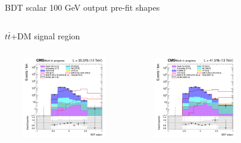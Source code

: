 \documentclass[8pt]{beamer}
\begin{document}
\begin{frame}{BDT scalar 100 GeV output pre-fit shapes}
\vspace{-8pt}
\begin{columns}
\begin{column}{1.09\textwidth}
\begin{block}{\centering $t \bar t$+DM signal region}\end{block} \vspace{10pt}
\end{column}
\end{columns} \vspace{-16pt}
\begin{columns}
		\begin{column}{0.33\textwidth}
			\begin{center}
     			\includegraphics[width=1.0\textwidth, height=100pt]{figs/2016/SmearSR-ttDM-scalar100/log_cratio_TTbar_topCR_ll_BDT_ttDM100_TTbar_BDT_output_scalar100_customBinsAttempt7.png}
    		\end{center}		
		\end{column}
		\begin{column}{0.33\textwidth}
			\begin{center}
     			\includegraphics[width=1.0\textwidth, height=100pt]{figs/2017/SmearSR-ttDM-scalar100/log_cratio_TTbar_topCR_ll_BDT_ttDM100_TTbar_BDT_output_scalar100_customBinsAttempt7.png}
    		\end{center}		
		\end{column}
		\begin{column}{0.33\textwidth}
			\begin{center}

\end{center}
\end{column}
\end{columns}
\end{frame}
\end{document}
